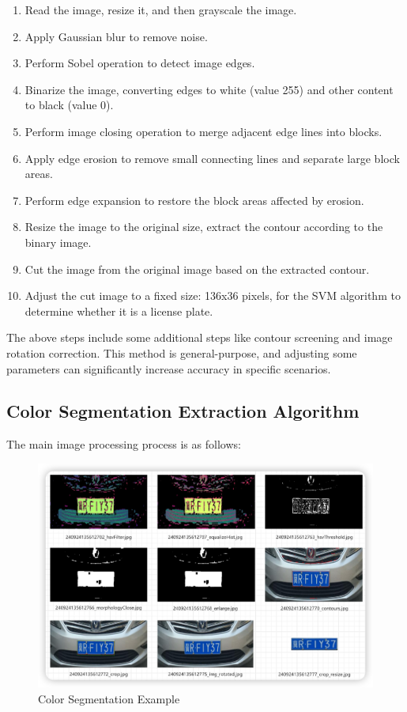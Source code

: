 \documentclass{article}
\begin{document}
	\begin{enumerate}
		\item Read the image, resize it, and then grayscale the image.
		\item Apply Gaussian blur to remove noise.
		\item Perform Sobel operation to detect image edges.
		\item Binarize the image, converting edges to white (value 255) and other content to black (value 0).
		\item Perform image closing operation to merge adjacent edge lines into blocks.
		\item Apply edge erosion to remove small connecting lines and separate large block areas.
		\item Perform edge expansion to restore the block areas affected by erosion.
		\item Resize the image to the original size, extract the contour according to the binary image.
		\item Cut the image from the original image based on the extracted contour.
		\item Adjust the cut image to a fixed size: 136x36 pixels, for the SVM algorithm to determine whether it is a license plate.
	\end{enumerate}
	
	The above steps include some additional steps like contour screening and image rotation correction. This method is general-purpose, and adjusting some parameters can significantly increase accuracy in specific scenarios.
	
	\subsection{Color Segmentation Extraction Algorithm}
	The main image processing process is as follows:
	
	\begin{figure}[H]
		\centering
		\includegraphics[width=\linewidth]{mdpic/image-20240924230824445.png}
		\caption{Color Segmentation Example}
	\end{figure}
	
\end{document}
